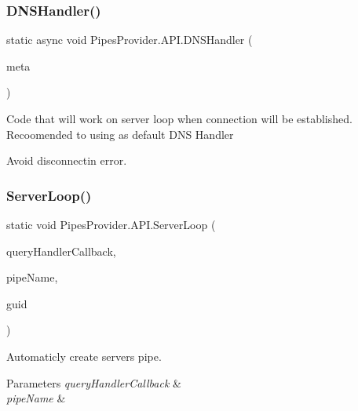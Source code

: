 \subsubsection{\texorpdfstring{D\+N\+S\+Handler()}{DNSHandler()}}
{\footnotesize\ttfamily static async void Pipes\+Provider.\+A\+P\+I.\+D\+N\+S\+Handler (\begin{DoxyParamCaption}\item[{\mbox{\hyperlink{class_pipes_provider_1_1_server_transmission_meta}{Pipes\+Provider.\+Server\+Transmission\+Meta}}}]{meta }\end{DoxyParamCaption})\hspace{0.3cm}{\ttfamily [static]}}



Code that will work on server loop when connection will be established. Recoomended to using as default D\+NS Handler 

Avoid disconnectin error. \mbox{\label{class_pipes_provider_1_1_a_p_i_abea09e221bfe03713f46b7223c6dd62f}} 
\subsubsection{\texorpdfstring{Server\+Loop()}{ServerLoop()}\hspace{0.1cm}{\footnotesize\ttfamily [1/4]}}
{\footnotesize\ttfamily static void Pipes\+Provider.\+A\+P\+I.\+Server\+Loop (\begin{DoxyParamCaption}\item[{System.\+Action$<$ \mbox{\hyperlink{class_pipes_provider_1_1_server_transmission_meta}{Server\+Transmission\+Meta}}, string $>$}]{query\+Handler\+Callback,  }\item[{string}]{pipe\+Name,  }\item[{out string}]{guid }\end{DoxyParamCaption})\hspace{0.3cm}{\ttfamily [static]}}



Automaticly create server\textquotesingle{}s pipe. 


\begin{DoxyParams}{Parameters}
{\em query\+Handler\+Callback} & \\
\hline
{\em pipe\+Name} & \\
\hline
\end{DoxyParams}
\mbox{\label{class_pipes_provider_1_1_a_p_i_aef65cfb6e72f44adf25b3cf8bc0d8656}} 
